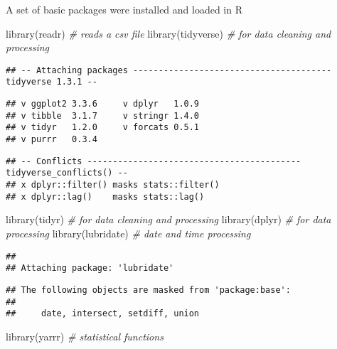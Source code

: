 \documentclass[
]{article}
\newenvironment{Shaded}{\begin{snugshade}}{\end{snugshade}}
\newcommand{\CommentTok}[1]{\textcolor[rgb]{0.56,0.35,0.01}{\textit{#1}}}
\newcommand{\FunctionTok}[1]{\textcolor[rgb]{0.00,0.00,0.00}{#1}}
\newcommand{\NormalTok}[1]{#1}
\begin{document}
A set of basic packages were installed and loaded in R

\begin{Shaded}
\begin{Highlighting}[]
\FunctionTok{library}\NormalTok{(readr) }\CommentTok{\# reads a csv file}
\FunctionTok{library}\NormalTok{(tidyverse) }\CommentTok{\# for data cleaning and processing}
\end{Highlighting}
\end{Shaded}

\begin{verbatim}
## -- Attaching packages --------------------------------------- tidyverse 1.3.1 --
\end{verbatim}

\begin{verbatim}
## v ggplot2 3.3.6     v dplyr   1.0.9
## v tibble  3.1.7     v stringr 1.4.0
## v tidyr   1.2.0     v forcats 0.5.1
## v purrr   0.3.4
\end{verbatim}

\begin{verbatim}
## -- Conflicts ------------------------------------------ tidyverse_conflicts() --
## x dplyr::filter() masks stats::filter()
## x dplyr::lag()    masks stats::lag()
\end{verbatim}

\begin{Shaded}
\begin{Highlighting}[]
\FunctionTok{library}\NormalTok{(tidyr) }\CommentTok{\# for data cleaning and processing}
\FunctionTok{library}\NormalTok{(dplyr) }\CommentTok{\# for data processing}
\FunctionTok{library}\NormalTok{(lubridate) }\CommentTok{\# date and time processing}
\end{Highlighting}
\end{Shaded}

\begin{verbatim}
## 
## Attaching package: 'lubridate'
\end{verbatim}

\begin{verbatim}
## The following objects are masked from 'package:base':
## 
##     date, intersect, setdiff, union
\end{verbatim}

\begin{Shaded}
\begin{Highlighting}[]
\FunctionTok{library}\NormalTok{(yarrr) }\CommentTok{\# statistical functions}
\end{Highlighting}
\end{Shaded}
\end{document}
